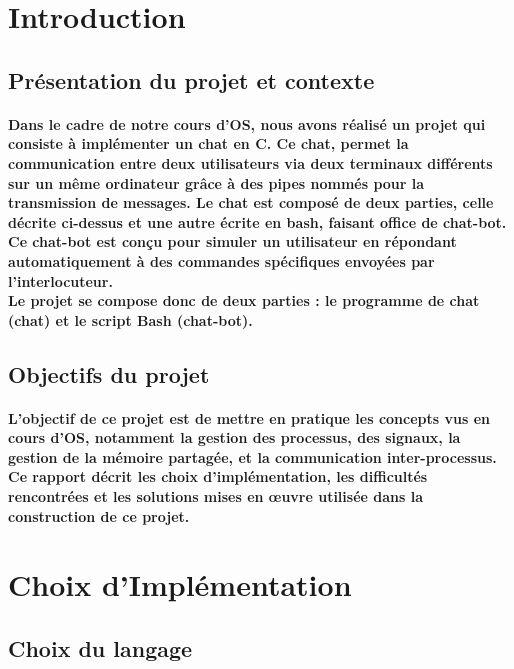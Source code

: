 \documentclass[utf8]{article}
\begin{document}
\newpage
\tableofcontents

\newpage


\section{Introduction}
\subsection{Présentation du projet et contexte}
\paragraph{Dans le cadre de notre cours d'OS, nous avons réalisé un projet qui consiste à implémenter un chat en C.
Ce chat, permet la communication entre deux utilisateurs via deux terminaux différents sur un même ordinateur grâce à des 
pipes nommés pour la transmission de messages. Le chat est composé de deux parties, celle décrite ci-dessus et une autre écrite en bash,
faisant office de chat-bot. Ce chat-bot est conçu pour simuler un utilisateur en répondant automatiquement à des commandes spécifiques 
envoyées par l’interlocuteur.\\
Le projet se compose donc de deux parties : le programme de chat (chat) et le script Bash (chat-bot).}

\subsection{Objectifs du projet}
\paragraph{L'objectif de ce projet est de mettre en pratique les concepts vus en cours d'OS, notamment la gestion des processus,
des signaux, la gestion de la mémoire partagée, et la communication inter-processus. 
Ce rapport décrit les choix d'implémentation, les difficultés rencontrées et les solutions mises en œuvre utilisée dans la 
construction de ce projet.}


\section{Choix d’Implémentation}
\subsection{Choix du langage}
\end{document}
